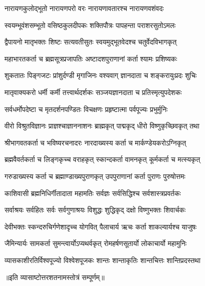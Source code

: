 
\twolineshloka
{नारायणकुलोद्भूतो नारायणपरो वरः}
{नारायणावतारश्च नारायणवशंवदः}

\twolineshloka
{स्वयम्भूवंशसम्भूतो वसिष्ठकुलदीपकः}
{शक्तिपौत्रः पापहन्ता पराशरसुतोऽमलः}

\twolineshloka
{द्वैपायनो मातृभक्तः शिष्टः सत्यवतीसुतः}
{स्वयमुद्भूतवेदश्च चतुर्वेदविभागकृत्}

\twolineshloka
{महाभारतकर्ता च ब्रह्मसूत्रप्रजापतिः}
{अष्टादशपुराणानां कर्ता श्यामः प्रशिष्यकः}

\twolineshloka
{शुकतातः पिङ्गजटः प्रांशुर्दण्डी मृगाजिनः}
{वश्यवाग् ज्ञानदाता च शङ्करायुःप्रदः शुचिः}

\twolineshloka
{मातृवाक्यकरो धर्मी कर्मी तत्त्वार्थदर्शकः}
{सञ्जयज्ञानदाता च प्रतिस्मृत्युपदेशकः}

\twolineshloka
{सर्वधर्मोपदेष्टा च मृतदर्शनपण्डितः}
{विचक्षणः प्रहृष्टात्मा पर्वपूज्यः प्रभुर्मुनिः}

\twolineshloka
{वीरो विश्रुतविज्ञानः प्राज्ञश्चाज्ञाननाशनः}
{ब्राह्मकृत् पाद्मकृद् धीरो विष्णुकृच्छिवकृत् तथा}

\twolineshloka
{श्रीभागवतकर्ता च भविष्यरचनादरः}
{नारदाख्यस्य कर्ता च मार्कण्डेयकरोऽग्निकृत्}

\twolineshloka
{ब्रह्मवैवर्तकर्ता च लिङ्गकृच्च वराहकृत्}
{स्कान्दकर्ता वामनकृत् कूर्मकर्ता च मत्स्यकृत्}

\twolineshloka
{गरुडाख्यस्य कर्ता च ब्रह्माण्डाख्यपुराणकृत्}
{उपपुराणानां कर्ता पुराणः पुरुषोत्तमः}

\twolineshloka
{काशिवासी ब्रह्मनिधिर्गीतादाता महामतिः}
{सर्वज्ञः सर्वसिद्धिश्च सर्वशास्त्रप्रवर्तकः}

\twolineshloka
{सर्वाश्रयः सर्वहितः सर्वः सर्वगुणाश्रयः}
{विशुद्धः शुद्धिकृद् दक्षो विष्णुभक्तः शिवार्चकः}

\twolineshloka
{देवीभक्तः स्कन्दरुचिर्गणेशादृच्च योगवित्}
{पैलाचार्य ऋचः कर्ता शाकल्यार्यश्च याजुषः}

\twolineshloka
{जैमिन्यार्यः सामकर्ता सुमन्त्वार्योऽप्यथर्वकृत्}
{रोमहर्षणसूतार्यो लोकाचार्यो महामुनिः}

\twolineshloka
{व्यासकाशीरतिर्विश्वपूज्यो विश्वेशपूजकः}
{शान्तः शान्ताकृतिः शान्तचित्तः शान्तिप्रदस्तथा}

॥इति व्यासाष्टोत्तरशतनामस्तोत्रं सम्पूर्णम्॥